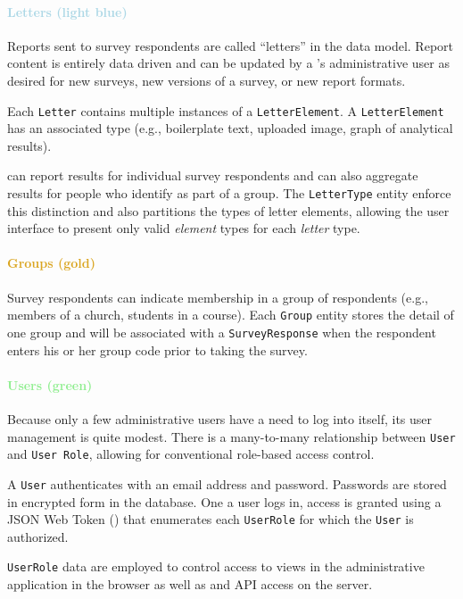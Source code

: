 \documentclass{article}
\begin{document}
\paragraph{\textcolor{LightBlue}{Letters (light blue)}}

Reports sent to survey respondents are called ``letters'' in the data model.
Report content is entirely data driven and can be updated by a \caper's administrative user
as desired for new surveys, new versions of a survey, or new report formats.

Each \texttt{Letter} contains multiple
instances of a \texttt{Letter\-Ele\-ment}.
A \texttt{Letter\-Ele\-ment} has an associated type
(e.g., boilerplate text,
uploaded image,
graph of analytical results).

\caper{} can report results for individual survey respondents
and can also aggregate results for people who identify as part of a group.
The \texttt{LetterType} entity enforce this distinction
and also partitions the types of letter elements,
allowing the user interface to present only valid \emph{element} types
for each \emph{letter} type.

\paragraph{\textcolor{Goldenrod}{Groups (gold)}}

Survey respondents can indicate membership in a group of respondents
(e.g., members of a church, students in a course).
Each \texttt{Group} entity stores the detail of one group
and will be associated with a \texttt{SurveyResponse}
when the respondent enters his or her group code
prior to taking the survey.

\paragraph{\textcolor{LightGreen}{Users (green)}}

Because only a few administrative users have a need to log into \caper{} itself,
its user management is quite modest.
There is a many-to-many relationship between \texttt{User} and \texttt{User Role},
allowing for conventional role-based access control.

A \texttt{User} authenticates with an email address and password.
Passwords are stored in encrypted form in the database.
One a user logs in,
access is granted using a
JSON Web Token (\jwt)
that enumerates each \texttt{UserRole} for which the \texttt{User} is authorized.

\texttt{UserRole} data are employed to control access to views
in the administrative application in the browser
as well as \gql{} and \rest{} API access on the server.
\end{document}
